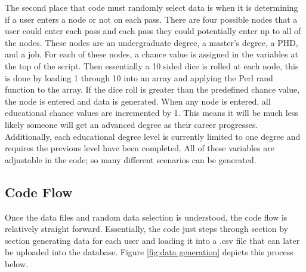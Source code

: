 The second place that code must randomly select data is when it is determining
if a user enters a node or not on each pass.  There are four possible nodes that
a user could enter each pass and each pass they could potentially enter up to
all of the nodes.  These nodes are an undergraduate degree, a master's degree, a
PHD, and a job.  For each of these nodes, a chance value is assigned in the
variables at the top of the script.  Then essentially a 10 sided dice is rolled
at each node, this is done by loading 1 through 10 into an array and applying
the Perl rand function to the array.  If the dice roll is greater than the
predefined chance value, the node is entered and data is generated.  When any
node is entered, all educational chance values are incremented by 1.  This means
it will be much less likely someone will get an advanced degree as their career
progresses.  Additionally, each educational degree level is currently limited to
one degree and requires the previous level have been completed.  All of these
variables are adjustable in the code; so many different scenarios can be
generated.


\subsection{Code Flow}
Once the data files and random data selection is understood, the code flow is
relatively straight forward.  Essentially, the code just steps through section
by section generating data for each user and loading it into a .csv file that
can later be uploaded into the database.  Figure \ref {fig:data generation}
depicts this process below.

\pagebreak
\usetikzlibrary{shapes,arrows,chains}


